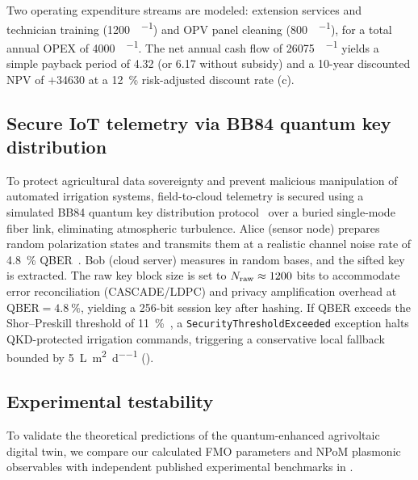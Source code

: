 \documentclass[12pt]{iopart}
\begin{document}
Two operating expenditure streams are modeled: extension services and technician training (\qty{1200}{\USD\per\yr}) and OPV panel cleaning (\qty{800}{\USD\per\yr}), for a total annual OPEX of \qty{4000}{\USD\per\yr}.
The net annual cash flow of \qty{26075}{\USD\per\yr} yields a simple payback period of \qty{4.32}{\yr} (or \qty{6.17}{\yr} without subsidy) and a 10-year discounted NPV of $+$\qty{34630}{\USD} at a \qty{12}{\percent} risk-adjusted discount rate (c).

\subsection{Secure IoT telemetry via BB84 quantum key distribution}

To protect agricultural data sovereignty and prevent malicious manipulation of automated irrigation systems, field-to-cloud telemetry is secured using a simulated BB84 quantum key distribution protocol~\cite{Bennett1984} over a buried single-mode fiber link, eliminating atmospheric turbulence. Alice (sensor node) prepares random polarization states and transmits them at a realistic channel noise rate of \qty{4.8}{\percent} QBER~\cite{Zahidy2024}.
Bob (cloud server) measures in random bases, and the sifted key is extracted. The raw key block size is set to $N_{\rm raw} \approx 1200$ bits to accommodate error reconciliation (CASCADE/LDPC) and privacy amplification overhead at $\mathrm{QBER}=\qty{4.8}{\percent}$, yielding a 256-bit session key after hashing.
If QBER exceeds the Shor--Preskill threshold of \qty{11}{\percent}~\cite{Shor2000}, a \texttt{SecurityThresholdExceeded} exception halts QKD-protected irrigation commands, triggering a conservative local fallback bounded by \qty{5}{\L\per\m\squared\per\day} ().

\subsection{Experimental testability}
\label{sec:experimental_testability}

To validate the theoretical predictions of the quantum-enhanced agrivoltaic digital twin, we compare our calculated FMO parameters and NPoM plasmonic observables with independent published experimental benchmarks in .
\end{document}
